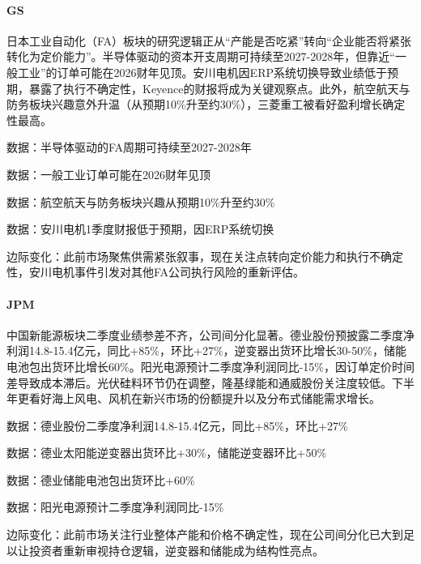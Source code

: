 \documentclass[11pt]{ctexart}
\begin{document}
\paragraph{GS} 日本工业自动化（FA）板块的研究逻辑正从“产能是否吃紧”转向“企业能否将紧张转化为定价能力”。半导体驱动的资本开支周期可持续至2027-2028年，但靠近“一般工业”的订单可能在2026财年见顶。安川电机因ERP系统切换导致业绩低于预期，暴露了执行不确定性，Keyence的财报将成为关键观察点。此外，航空航天与防务板块兴趣意外升温（从预期10\%升至约30\%），三菱重工被看好盈利增长确定性最高。
{\small\color{refgray}数据：半导体驱动的FA周期可持续至2027-2028年\par}
{\small\color{refgray}数据：一般工业订单可能在2026财年见顶\par}
{\small\color{refgray}数据：航空航天与防务板块兴趣从预期10\%升至约30\%\par}
{\small\color{refgray}数据：安川电机1季度财报低于预期，因ERP系统切换\par}
{\small\color{refgray}边际变化：此前市场聚焦供需紧张叙事，现在关注点转向定价能力和执行不确定性，安川电机事件引发对其他FA公司执行风险的重新评估。\par}
\paragraph{JPM} 中国新能源板块二季度业绩参差不齐，公司间分化显著。德业股份预披露二季度净利润14.8-15.4亿元，同比+85\%，环比+27\%，逆变器出货环比增长30-50\%，储能电池包出货环比增长60\%。阳光电源预计二季度净利润同比-15\%，因订单定价时间差导致成本滞后。光伏硅料环节仍在调整，隆基绿能和通威股份关注度较低。下半年更看好海上风电、风机在新兴市场的份额提升以及分布式储能需求增长。
{\small\color{refgray}数据：德业股份二季度净利润14.8-15.4亿元，同比+85\%，环比+27\%\par}
{\small\color{refgray}数据：德业太阳能逆变器出货环比+30\%，储能逆变器环比+50\%\par}
{\small\color{refgray}数据：德业储能电池包出货环比+60\%\par}
{\small\color{refgray}数据：阳光电源预计二季度净利润同比-15\%\par}
{\small\color{refgray}边际变化：此前市场关注行业整体产能和价格不确定性，现在公司间分化已大到足以让投资者重新审视持仓逻辑，逆变器和储能成为结构性亮点。\par}
\end{document}
